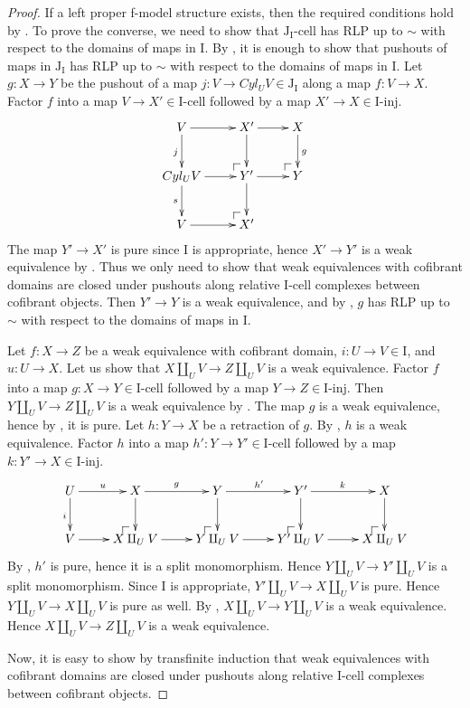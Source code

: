 \documentclass{amsart}
\makeatletter
\theoremstyle{definition}
\newcommand{\I}{\mathrm{I}}
\newcommand{\J}{\mathrm{J}}
\newcommand{\class}[2]{#1\text{-}\mathrm{#2}}
\newcommand{\Iinj}[1][\I]{\class{#1}{inj}}
\newcommand{\Icell}[1][\I]{\class{#1}{cell}}
\newcommand{\Jcell}[1][]{\Icell[\J#1]}
\newcommand{\po}[1][dr]{\save*!/#1+1.2pc/#1:(1,-1)@^{|-}\restore}
\makeatother
\begin{document}
\begin{proof}
If a left proper f-model structure exists, then the required conditions hold by .
To prove the converse, we need to show that $\Jcell[_\I]$ has
RLP up to $\sim$ with respect to the domains of maps in $\I$.
By , it is enough to show that pushouts of maps in
$\J_\I$ has RLP up to $\sim$ with respect to the domains of maps in $\I$.
Let $g : X \to Y$ be the pushout of a map $j : V \to Cyl_U V \in \J_\I$ along a map $f : V \to X$.
Factor $f$ into a map $V \to X' \in \Icell$ followed by a map $X' \to X \in \Iinj$.
\[ \xymatrix{ V       \ar[r] \ar[d]_j &     X' \ar[r] \ar[d] &     X \ar[d]^g \\
              Cyl_U V \ar[r] \ar[d]_s & \po Y' \ar[r] \ar[d] & \po Y \\
              V       \ar[r] & \po X'
            } \]
The map $Y' \to X'$ is pure since $\I$ is appropriate, hence $X' \to Y'$ is a weak equivalence by .
Thus we only need to show that weak equivalences with cofibrant domains are closed
under pushouts along relative $\I$-cell complexes between cofibrant objects.
Then $Y' \to Y$ is a weak equivalence, and by ,
$g$ has RLP up to $\sim$ with respect to the domains of maps in $\I$.

Let $f : X \to Z$ be a weak equivalence with cofibrant domain, $i : U \to V \in \I$, and $u : U \to X$.
Let us show that $X \amalg_U V \to Z \amalg_U V$ is a weak equivalence.
Factor $f$ into a map $g : X \to Y \in \Icell$ followed by a map $Y \to Z \in \Iinj$.
Then $Y \amalg_U V \to Z \amalg_U V$ is a weak equivalence by .
The map $g$ is a weak equivalence, hence by , it is pure.
Let $h : Y \to X$ be a retraction of $g$.
By , $h$ is a weak equivalence.
Factor $h$ into a map $h' : Y \to Y' \in \Icell$ followed by a map $k : Y' \to X \in \Iinj$.
\[ \xymatrix{ U \ar[d]_i \ar[r]^u &     X \ar[d]     \ar[r]^g &     Y \ar[d]     \ar[r]^{h'} &     Y' \ar[d]     \ar[r]^k &     X \ar[d] \\
              V          \ar[r]   & \po X \amalg_U V \ar[r]   & \po Y \amalg_U V \ar[r]      & \po Y' \amalg_U V \ar[r]   & \po X \amalg_U V
            } \]
By , $h'$ is pure, hence it is a split monomorphism.
Hence $Y \amalg_U V \to Y' \amalg_U V$ is a split monomorphism.
Since $\I$ is appropriate, $Y' \amalg_U V \to X \amalg_U V$ is pure.
Hence $Y \amalg_U V \to X \amalg_U V$ is pure as well.
By , $X \amalg_U V \to Y \amalg_U V$ is a weak equivalence.
Hence $X \amalg_U V \to Z \amalg_U V$ is a weak equivalence.

Now, it is easy to show by transfinite induction that weak equivalences with cofibrant domains are closed
under pushouts along relative $\I$-cell complexes between cofibrant objects.
\end{proof}



\end{document}
